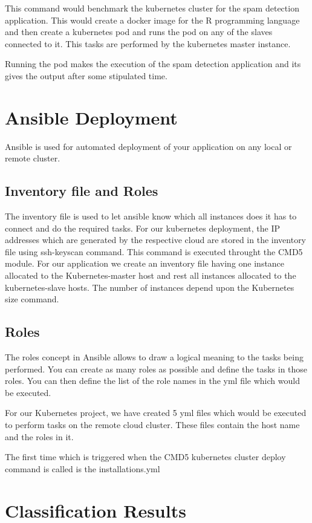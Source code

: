 \documentclass[9pt,twocolumn,twoside]{../../styles/osajnl}
\begin{document}
This command would benchmark the kubernetes cluster for the spam
detection application. This would create a docker image for the R
programming language and then create a kubernetes pod and runs the pod
on any of the slaves connected to it. This tasks are performed by the
kubernetes master instance.

Running the pod makes the execution of the spam detection application
and its gives the output after some stipulated time.

\section{Ansible Deployment}
Ansible is used for automated deployment of your application on any
local or remote cluster.

\subsection{Inventory file and Roles}
The inventory file is used to let ansible know which all instances
does it has to connect and do the required tasks. For our kubernetes
deployment, the IP addresses which are generated by the respective
cloud are stored in the inventory file using ssh-keyscan command. This
command is executed throught the CMD5 module. For our application we
create an inventory file having one instance allocated to the
Kubernetes-master host and rest all instances allocated to the
kubernetes-slave hosts.  The number of instances depend upon the
Kubernetes size command.

\subsection{Roles}
The roles concept in Ansible allows to draw a logical meaning to the
tasks being performed. You can create as many roles as possible and
define the tasks in those roles. You can then define the list of the
role names in the yml file which would be executed.

For our Kubernetes project, we have created 5 yml files which would be
executed to perform tasks on the remote cloud cluster.  These files
contain the host name and the roles in it.

The first time which is triggered when the CMD5 kubernetes cluster
deploy command is called is the installations.yml

\section{Classification Results}
\end{document}
